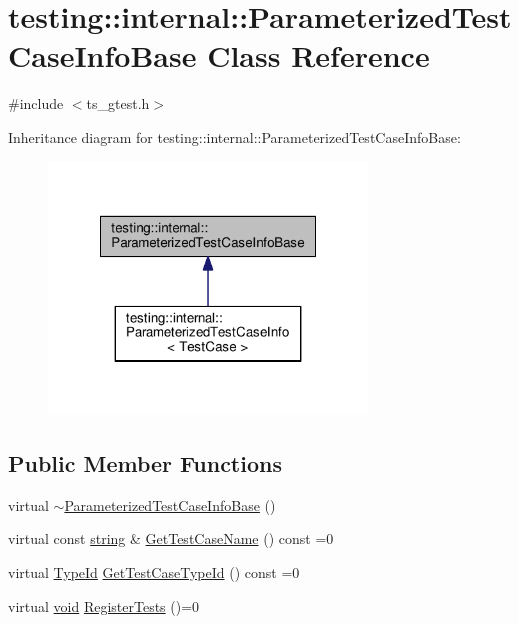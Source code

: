 \hypertarget{classtesting_1_1internal_1_1ParameterizedTestCaseInfoBase}{\section{testing\-:\-:internal\-:\-:Parameterized\-Test\-Case\-Info\-Base Class Reference}
\label{classtesting_1_1internal_1_1ParameterizedTestCaseInfoBase}
}


{\ttfamily \#include $<$ts\-\_\-gtest.\-h$>$}



Inheritance diagram for testing\-:\-:internal\-:\-:Parameterized\-Test\-Case\-Info\-Base\-:\nopagebreak
\begin{figure}[H]
\begin{center}
\leavevmode
\includegraphics[width=240pt]{classtesting_1_1internal_1_1ParameterizedTestCaseInfoBase__inherit__graph}
\end{center}
\end{figure}
\subsection*{Public Member Functions}
\begin{DoxyCompactItemize}
\item 
virtual \hyperlink{classtesting_1_1internal_1_1ParameterizedTestCaseInfoBase_affae85e908f0901a8f0f1f9576843e35}{$\sim$\-Parameterized\-Test\-Case\-Info\-Base} ()
\item 
virtual const \hyperlink{namespacetesting_1_1internal_a8e8ff5b11e64078831112677156cb111}{string} \& \hyperlink{classtesting_1_1internal_1_1ParameterizedTestCaseInfoBase_a0c809cfb964cb9560d49ae830e2b6469}{Get\-Test\-Case\-Name} () const =0
\item 
virtual \hyperlink{namespacetesting_1_1internal_ab1114197d3c657d8b7f8e0c5caa12d00}{Type\-Id} \hyperlink{classtesting_1_1internal_1_1ParameterizedTestCaseInfoBase_a932b4a9185a72d5bdfa5fd84fc06cbca}{Get\-Test\-Case\-Type\-Id} () const =0
\item 
virtual \hyperlink{legacy_8hpp_a8bb47f092d473522721002c86c13b94e}{void} \hyperlink{classtesting_1_1internal_1_1ParameterizedTestCaseInfoBase_a92baca6c64c822c2e7043217f7903ef2}{Register\-Tests} ()=0
\end{DoxyCompactItemize}
